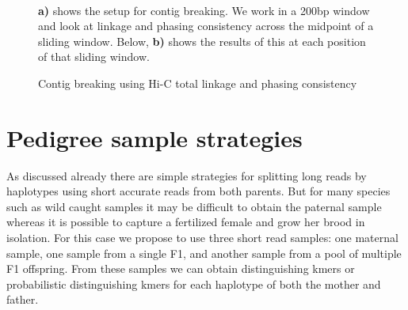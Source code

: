 {\begin{figure}[htbp!]
\caption{Contig breaking using Hi-C total linkage and phasing consistency}
\label{figure:contigbreaking}
\begin{centering}
 \\
\par{\textbf{a)} shows the setup for contig breaking. We work in a 200bp window and look at linkage and phasing consistency across the midpoint of a sliding window. Below, \textbf{b)} shows the results of this at each position of that sliding window. }
\end{centering}
\end{figure}


\section{Pedigree sample strategies}
As discussed already there are simple strategies for splitting long reads by haplotypes using short accurate reads from both parents. 
But for many species such as wild caught samples it may be difficult to obtain the paternal sample whereas it is possible to capture a 
fertilized female and grow her brood in isolation. For this case we propose to use three short read samples: one maternal sample, one sample 
from a single F1, and another sample from a pool of multiple F1 offspring. From these samples we can obtain distinguishing kmers or probabilistic 
distinguishing kmers for each haplotype of both the mother and father.

}
